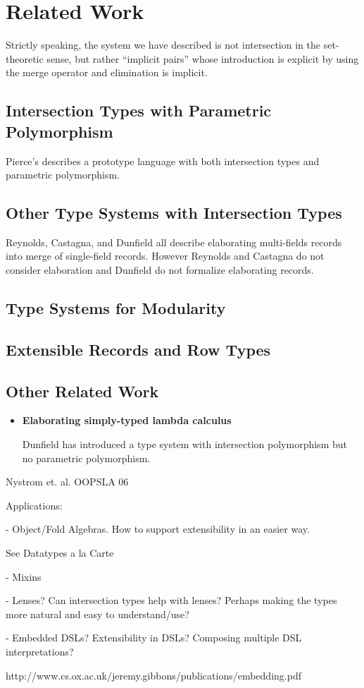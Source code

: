 \section{Related Work}

Strictly speaking, the system we have described is not intersection in the
set-theoretic sense, but rather ``implicit pairs'' whose introduction is
explicit by using the merge operator and elimination is implicit.

\subsection{Intersection Types with Parametric Polymorphism}

Pierce's describes a prototype language with both intersection types and
parametric polymorphism.

\subsection{Other Type Systems with Intersection Types}

Reynolds, Castagna, and Dunfield all describe elaborating multi-fields records
into merge of single-field records. However Reynolds and Castagna do not
consider elaboration and Dunfield do not formalize elaborating records.

\subsection{Type Systems for Modularity}

\subsection{Extensible Records and Row Types}

\subsection{Other Related Work}

\begin{itemize}

\item{\bf Elaborating simply-typed lambda calculus}

  Dunfield has introduced a type system with intersection polymorphism but no
  parametric polymorphism.

\end{itemize}

Nystrom et. al. OOPSLA 06

Applications:

- Object/Fold Algebras. How to support extensibility in an easier way.

See Datatypes a la Carte

- Mixins

- Lenses? Can intersection types help with lenses? Perhaps making the
types more natural and easy to understand/use?

- Embedded DSLs? Extensibility in DSLs? Composing multiple DSL interpretations?

http://www.cs.ox.ac.uk/jeremy.gibbons/publications/embedding.pdf
